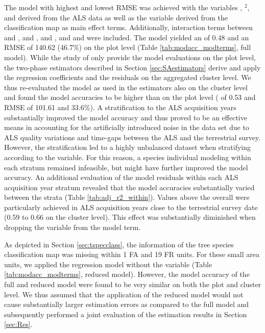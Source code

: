 The model with highest \adjrsq{} and lowest RMSE was achieved with the variables \meanheight{}, \meanheight{}$^2$, \stddev{} and \alsyear{} derived from the ALS data as well as the \treespecies{} variable derived from the classification map as main effect terms. Additionally, interaction terms between \meanheight{} and \alsyear{}, \stddev{} and \alsyear{}, \meanheight{} and \stddev{}, and \meanheight{} and \treespecies{} were included. The model yielded an \adjrsq{} of 0.48 and an RMSE of 140.62 \mha{} (46.7\%) on the plot level (Table \ref{tab:modacc_modterms}, full model). While the study of \citet{hill2017a} only provide the model evaluations on the plot level, the two-phase estimators described in Section \ref{sec:SAestimators} derive and apply the regression coefficients and the residuals on the aggregated cluster level. We thus re-evaluated the model as used in the estimators also on the cluster level and found the model accuracies to be higher than on the plot level (\adjrsq{} of 0.53 and RMSE of 101.61 \mha{} and 33.6\%). A stratification to the ALS acquisition years substantially improved the model accuracy and thus proved to be an effective means in accounting for the artificially introduced noise in the data set due to ALS quality variations and time-gaps between the ALS and the terrestrial survey. However, the stratification led to a highly unbalanced dataset when stratifying according to the \treespecies{} variable. For this reason, a species individual modeling within each \alsyear{} stratum remained infeasible, but might have further improved the model accuracy. An additional evaluation of the model residuals within each ALS acquisition year stratum revealed that the model accuracies substantially varied between the strata (Table \ref{tab:adj_r2_within}). Values above the overall \adjrsq{} were particularly achieved in ALS acquisition years close to the terrestrial survey date (0.59 to 0.66 on the cluster level). This effect was substantially diminished when dropping the \alsyear{} variable from the model term.\par

As depicted in Section \ref{sec:tspecclass}, the information of the tree species classification map was missing within 1 FA and 19 FR units. For these small area units, we applied the regression model without the \treespecies{} variable (Table \ref{tab:modacc_modterms}, reduced model). However, the model accuracy of the full and reduced model were found to be very similar on both the plot and cluster level. We thus assumed that the application of the reduced model would not cause substantially larger estimation errors as compared to the full model and subsequently performed a joint evaluation of the estimation results in Section \ref{sec:Res}.

